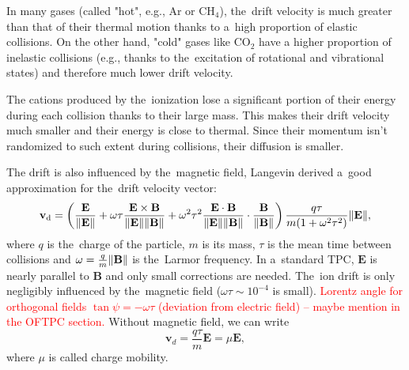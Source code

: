 			In many gases (called "hot", e.g., Ar or CH$_4$), the~drift velocity is much greater than that of their thermal motion thanks to a~high proportion of elastic collisions. On the other hand, "cold" gases like CO$_2$ have a higher proportion of inelastic collisions (e.g., thanks to the~excitation of rotational and vibrational states) and therefore much lower drift velocity.
			
			The cations produced by the~ionization lose a significant portion of their energy during each collision thanks to their large mass. This makes their drift velocity much smaller and their energy is close to thermal. Since their momentum isn't randomized to such extent during collisions, their diffusion is smaller.
			
			The drift is also influenced by the~magnetic field, Langevin derived a~good approximation for the~drift velocity vector:
				\begin{equation}
					\label{eq:drift}
					\mathbf{v}_\text{d} = \left(\frac{\mathbf{E}}{\norm{\mathbf{E}}} + \omega\tau\frac{\mathbf{E}\times\mathbf{B}}{\norm{\mathbf{E}}\norm{\mathbf{B}}} + \omega^2\tau^2\frac{\mathbf{E}\cdot\mathbf{B}}{\norm{\mathbf{E}}\norm{\mathbf{B}}}\cdot \frac{\mathbf{B}}{\norm{\mathbf{B}}}\right) \frac{q\tau}{m(1+\omega^2\tau^2)}\norm{\mathbf{E}},
				\end{equation}
			where $q$ is the~charge of the particle, $m$ is its mass, $\tau$ is the mean time between collisions and $\omega = \frac{q}{m}\norm{\mathbf{B}}$ is the~Larmor frequency. In a~standard \ac{TPC}, $\mathbf{E}$ is nearly parallel to $\mathbf{B}$ and only small corrections are needed. The~ion drift is only negligibly influenced by the~magnetic field ($\omega\tau\sim10^{-4}$ is small). \textcolor{red}{Lorentz angle for orthogonal fields $\tan\psi = -\omega\tau$ (deviation from electric field) -- maybe mention in the OFTPC section.} Without magnetic field, we can write
				\begin{equation}
					\mathbf{v}_d = \frac{q\tau}{m} \mathbf{E} = \mu \mathbf{E},
				\end{equation}
			where $\mu$ is called charge mobility.
			
